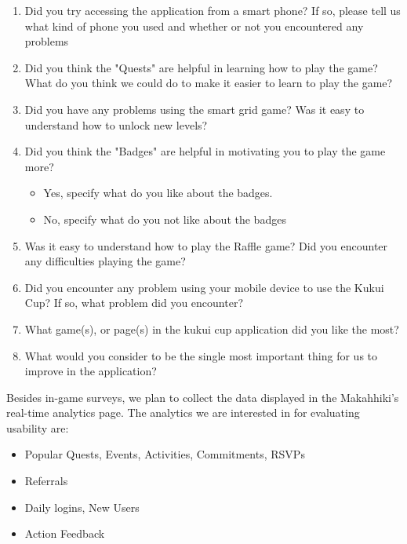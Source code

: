 \documentclass[11pt]{article}
\begin{document}
\begin{enumerate}
\item Did you try accessing the application from a smart phone?  If so, please tell us what kind of phone you used and whether or not you encountered any problems

\item Did you think the "Quests" are helpful in learning how to play the game? What do you think we could do to make it easier to learn to play the game?

\item  Did you have any problems using the smart grid game?  Was it easy to understand how to unlock new levels? 

\item Did you think the "Badges" are helpful in motivating you to play the game more? 
\begin{itemize}
\item Yes, specify what do you like about the badges.
\item No, specify what do you not like about the badges
\end{itemize}

\item Was it easy to understand how to play the Raffle game? Did you encounter any difficulties playing the game?

\item Did you encounter any problem using your mobile device to use the Kukui Cup? If so, what problem did you encounter?

\item What game(s), or page(s) in the kukui cup application did you like the most?

\item What would you consider to be the single most important thing for us to improve in the application?

\end{enumerate}

Besides in-game surveys, we plan to collect the data displayed in the Makahhiki's real-time analytics page. The analytics we are interested in for evaluating usability are:

\begin{itemize}
 \item Popular Quests, Events, Activities, Commitments, RSVPs
 \item Referrals
 \item Daily logins, New Users
 \item Action Feedback
\end{itemize}
\end{document}
